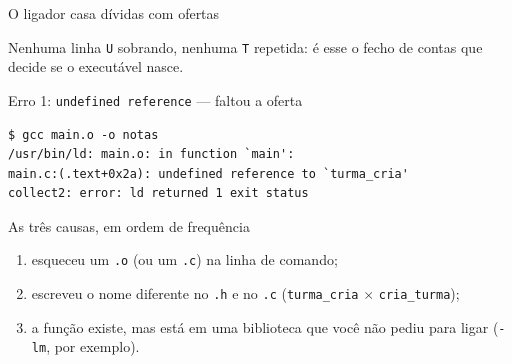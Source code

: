 \documentclass[aspectratio=169]{beamer}
\begin{document}
\begin{frame}{O ligador casa dívidas com ofertas}
  \begin{center}
  \end{center}
  \begin{block}{}
    \small Nenhuma linha \texttt{U} sobrando, nenhuma \texttt{T} repetida:
    é esse o fecho de contas que decide se o executável nasce.
  \end{block}
\end{frame}

\begin{frame}[fragile]{Erro 1: \texttt{undefined reference} --- faltou a oferta}
\begin{lstlisting}[style=shellStyle]
$ gcc main.o -o notas
/usr/bin/ld: main.o: in function `main':
main.c:(.text+0x2a): undefined reference to `turma_cria'
collect2: error: ld returned 1 exit status
\end{lstlisting}
  \begin{block}{As três causas, em ordem de frequência}
    \small
    \begin{enumerate}
      \item esqueceu um \texttt{.o} (ou um \texttt{.c}) na linha de comando;
      \item escreveu o nome diferente no \texttt{.h} e no \texttt{.c}
        (\texttt{turma\_cria} $\times$ \texttt{cria\_turma});
      \item a função existe, mas está em uma biblioteca que você não pediu
        para ligar (\texttt{-lm}, por exemplo).
    \end{enumerate}
  \end{block}
\end{frame}
\end{document}
